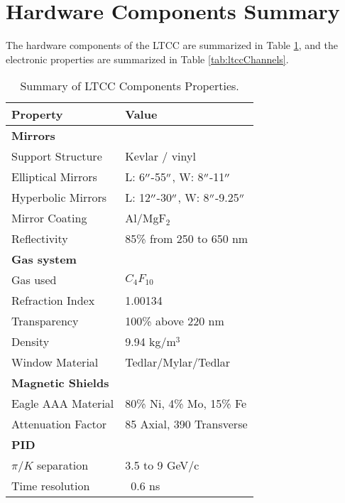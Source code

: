 \section{Hardware Components Summary}


The hardware components of the LTCC are summarized in Table \ref{tab:ltccProperties}, and the electronic properties
are summarized in Table \ref{tab:ltccChannels}.

\begin{table}[h]
	\begin{center}
		\begin{tabular}{| l | l |}
			\hline \hline
			Property                 & Value \\
			\hline
			{\bf Mirrors}            &                               \\
			Support Structure        & Kevlar / vinyl                \\
			Elliptical Mirrors       & L: 6$^{\prime\prime}$-55$^{\prime\prime}$,  W: 8$^{\prime\prime}$-11$^{\prime\prime}$     \\
			Hyperbolic Mirrors       & L: 12$^{\prime\prime}$-30$^{\prime\prime}$, W: 8$^{\prime\prime}$-9.25$^{\prime\prime}$   \\
			Mirror Coating           & Al/MgF$_2$                    \\
			Reflectivity             & 85\% from 250 to 650 nm       \\
			{\bf Gas system}         &                               \\
			Gas used                 &   $C_4F_{10}$                 \\
			Refraction Index         & 1.00134                       \\
			Transparency             & 100\% above 220 nm            \\
			Density                  & 9.94 kg/m$^3$                 \\
			Window Material          & Tedlar/Mylar/Tedlar           \\
			{\bf Magnetic Shields}   &                               \\
			Eagle AAA Material       & 80\% Ni, 4\% Mo, 15\% Fe      \\
			Attenuation Factor       &  85 Axial, 390 Transverse     \\
			{\bf PID}                &                               \\
			$\pi/K$ separation       &  3.5 to 9 GeV/c               \\
			Time resolution          &  ~0.6 ns                      \\
			\hline \hline
		\end{tabular}
	\end{center}
\caption{Summary of LTCC Components Properties.}\label{tab:ltccProperties}
\end{table}

